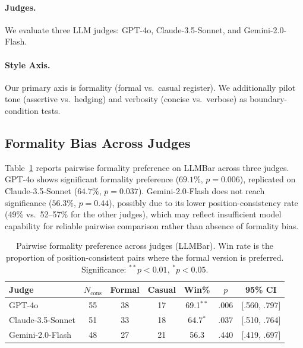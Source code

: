 \documentclass[11pt,a4paper]{article}
\begin{document}
\paragraph{Judges.} We evaluate three LLM judges: GPT-4o, Claude-3.5-Sonnet, and Gemini-2.0-Flash.

\paragraph{Style Axis.} Our primary axis is formality (formal vs.\ casual register).
We additionally pilot tone (assertive vs.\ hedging) and verbosity (concise vs.\ verbose) as boundary-condition tests.

\subsection{Formality Bias Across Judges}
\label{sec:multi_judge}

Table~\ref{tab:multi_judge} reports pairwise formality preference on LLMBar across three judges.
GPT-4o shows significant formality preference ($69.1\%$, $p=0.006$), replicated on Claude-3.5-Sonnet ($64.7\%$, $p=0.037$).
Gemini-2.0-Flash does not reach significance ($56.3\%$, $p=0.44$), possibly due to its lower position-consistency rate (49\% vs.\ 52--57\% for the other judges), which may reflect insufficient model capability for reliable pairwise comparison rather than absence of formality bias.

\begin{table}[t]
\centering
\small
\caption{Pairwise formality preference across judges (LLMBar). Win rate is the proportion of position-consistent pairs where the formal version is preferred. Significance: $^{**}p<0.01$, $^{*}p<0.05$.}
\label{tab:multi_judge}
\begin{tabular}{lcccccc}
\toprule
\textbf{Judge} & \textbf{$N_{\text{cons}}$} & \textbf{Formal} & \textbf{Casual} & \textbf{Win\%} & \textbf{$p$} & \textbf{95\% CI} \\
\midrule
GPT-4o & 55 & 38 & 17 & 69.1$^{**}$ & .006 & [.560, .797] \\
Claude-3.5-Sonnet & 51 & 33 & 18 & 64.7$^{*}$ & .037 & [.510, .764] \\
Gemini-2.0-Flash & 48 & 27 & 21 & 56.3 & .440 & [.419, .697] \\
\bottomrule
\end{tabular}
\end{table}

\end{document}
